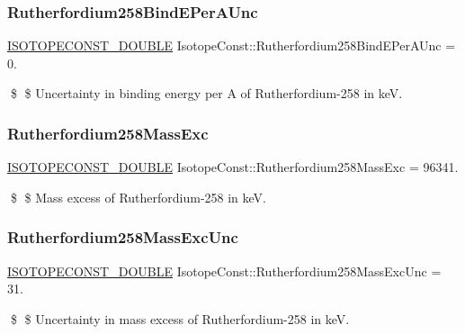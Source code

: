 \subsubsection{\texorpdfstring{Rutherfordium258\+Bind\+E\+Per\+A\+Unc}{Rutherfordium258BindEPerAUnc}}
{\footnotesize\ttfamily \mbox{\hyperlink{group___isotope_const-_macros_ga8f45a7272ce02c0b4c65c44636ed719a}{I\+S\+O\+T\+O\+P\+E\+C\+O\+N\+S\+T\+\_\+\+D\+O\+U\+B\+LE}} Isotope\+Const\+::\+Rutherfordium258\+Bind\+E\+Per\+A\+Unc = 0.}

\$ \$ Uncertainty in binding energy per A of Rutherfordium-\/258 in keV. \mbox{\label{group___isotope_const-_rutherfordium-_rf258_gac0b7d26b1eff533037fa704409227b1b}} 
\subsubsection{\texorpdfstring{Rutherfordium258\+Mass\+Exc}{Rutherfordium258MassExc}}
{\footnotesize\ttfamily \mbox{\hyperlink{group___isotope_const-_macros_ga8f45a7272ce02c0b4c65c44636ed719a}{I\+S\+O\+T\+O\+P\+E\+C\+O\+N\+S\+T\+\_\+\+D\+O\+U\+B\+LE}} Isotope\+Const\+::\+Rutherfordium258\+Mass\+Exc = 96341.}

\$ \$ Mass excess of Rutherfordium-\/258 in keV. \mbox{\label{group___isotope_const-_rutherfordium-_rf258_gafb03200ef74bbad8d768283549768b92}} 
\subsubsection{\texorpdfstring{Rutherfordium258\+Mass\+Exc\+Unc}{Rutherfordium258MassExcUnc}}
{\footnotesize\ttfamily \mbox{\hyperlink{group___isotope_const-_macros_ga8f45a7272ce02c0b4c65c44636ed719a}{I\+S\+O\+T\+O\+P\+E\+C\+O\+N\+S\+T\+\_\+\+D\+O\+U\+B\+LE}} Isotope\+Const\+::\+Rutherfordium258\+Mass\+Exc\+Unc = 31.}

\$ \$ Uncertainty in mass excess of Rutherfordium-\/258 in keV. \mbox{\label{group___isotope_const-_rutherfordium-_rf258_gab5bec0f4e86986aec09426c66d92c419}} 
